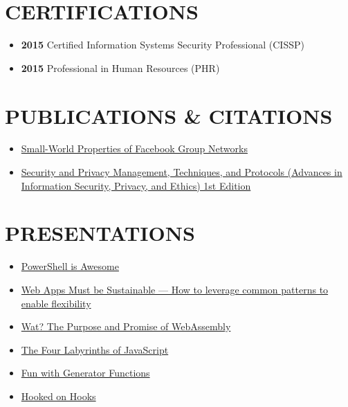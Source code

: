 \documentclass[10pt]{article}
\def\tightlist{}
\begin{document}
\section{CERTIFICATIONS}\label{certifications}

\begin{itemize}
\tightlist
\item
  \textbf{2015} Certified Information Systems Security Professional
  (CISSP)
\item
  \textbf{2015} Professional in Human Resources (PHR)
\end{itemize}

\section{PUBLICATIONS \& CITATIONS}\label{publications-citations}

\begin{itemize}
\tightlist
\item
  \href{http://wpmedia.wolfram.com/uploads/sites/13/2018/02/23-3-1.pdf}{Small-World
  Properties of Facebook Group Networks}
\item
  \href{https://smile.amazon.com/gp/product/1522555838/ref=ppx_yo_dt_b_asin_title_o02_s00?ie=UTF8&psc=1}{Security
  and Privacy Management, Techniques, and Protocols (Advances in
  Information Security, Privacy, and Ethics) 1st Edition}
\end{itemize}

\section{PRESENTATIONS}\label{presentations}

\begin{itemize}
\tightlist
\item
  \href{https://powershell.surge.sh/}{PowerShell is Awesome}
\item
  \href{http://sustainable.surge.sh/}{Web Apps Must be Sustainable ---
  How to leverage common patterns to enable flexibility}
\item
  \href{http://wat-brown-bag.surge.sh/}{Wat? The Purpose and Promise of
  WebAssembly}
\item
  \href{http://www.jasonwohlgemuth.com/slides-javascript-labyrinths/\#/title}{The
  Four Labyrinths of JavaScript}
\item
  \href{https://generators.surge.sh/}{Fun with Generator Functions}
\item
  \href{http://hooked-on-hooks.surge.sh/}{Hooked on Hooks}
\end{itemize}
\end{document}
